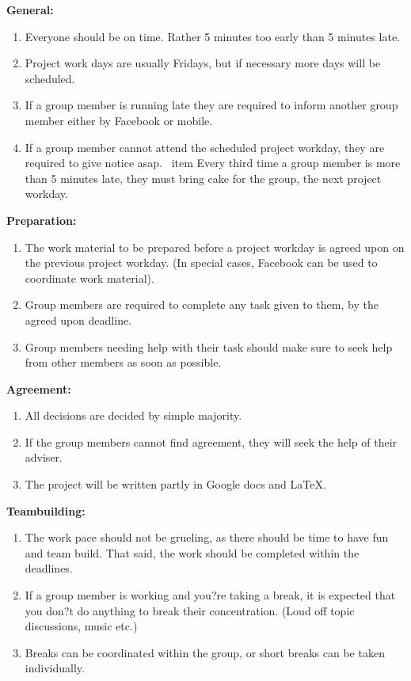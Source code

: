\documentclass[../ProjectFoundation.tex]{subfiles}
\begin{document}
\textbf{General:}
\begin{enumerate}
	\item Everyone should be on time. Rather 5 minutes too early than 5 minutes late.
	\item Project work days are usually Fridays, but if necessary more days will be scheduled.
	\item If a group member is running late they are required to inform another group member either by Facebook or mobile.
	\item If a group member cannot attend the scheduled project workday, they are required to give notice asap.
\	item Every third time a group member is more than 5 minutes late, they must bring cake for the group, the next project workday.
\end{enumerate}
\textbf{Preparation:}
\begin{enumerate}
	\item The work material to be prepared before a project workday is agreed upon on the previous project workday. (In special cases, Facebook can be used to coordinate work material).
	\item Group members are required to complete any task given to them, by the agreed upon deadline.
	\item Group members needing help with their task should make sure to seek help from other members as soon as possible.
\end{enumerate}
\textbf{Agreement:}
\begin{enumerate}
	\item All decisions are decided by simple majority.
	\item If the group members cannot find agreement, they will seek the help of their adviser.
	\item The project will be written partly in Google docs and \LaTeX{}.
\end{enumerate}
\textbf{Teambuilding:}
\begin{enumerate}
	\item The work pace should not be grueling, as there should be time to have fun and team build. That said, the work should be completed within the deadlines.
	\item If a group member is working and you?re taking a break, it is expected that you don?t do anything to break their concentration. (Loud off topic discussions, music etc.)
	\item Breaks can be coordinated within the group, or short breaks can be taken individually.
\end{enumerate}
\end{document}
